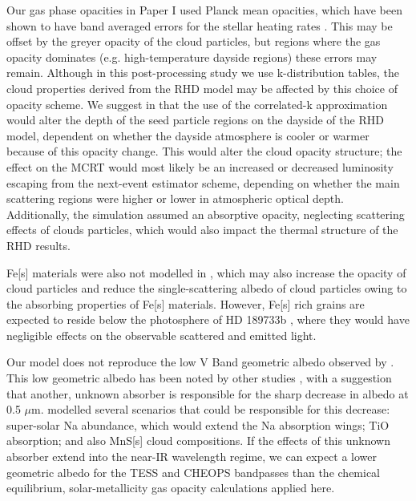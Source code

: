 \documentclass{aa}
\begin{document}
Our gas phase opacities in Paper I used Planck mean opacities, which have been shown to have band averaged errors for the stellar heating rates \citep{Amundsen2014}. 
This may be offset by the greyer opacity of the cloud particles, but regions where the gas opacity dominates (e.g. high-temperature dayside regions) these errors may remain.
Although in this post-processing study we use k-distribution tables, the cloud properties derived from the RHD model may be affected by this choice of opacity scheme.
We suggest in \citet{Lee2016} that the use of the correlated-k approximation would alter the depth of the seed particle regions on the dayside of the RHD model, dependent on whether the dayside atmosphere is cooler or warmer because of this opacity change.
This would alter the cloud opacity structure; the effect on the MCRT would most likely be an increased or decreased luminosity escaping from the next-event estimator scheme, depending on whether the main scattering regions were higher or lower in atmospheric optical depth. 
Additionally, the \citet{Lee2016} simulation assumed an absorptive opacity, neglecting scattering effects of clouds particles, which would also impact the thermal structure of the RHD results.

Fe[s] materials were also not modelled in \citet{Lee2016}, which may also increase the opacity of cloud particles and reduce the single-scattering albedo of cloud particles owing to the absorbing properties of Fe[s] materials.
However, Fe[s] rich grains are expected to reside below the photosphere of HD 189733b \citep{Lee2015b, Helling2016}, where they would have negligible effects on the observable scattered and emitted light.

Our model does not reproduce the low V Band geometric albedo observed by \citet{Evans2013}.
This low geometric albedo has been noted by other studies \citep[e.g.][]{Barstow2014}, with a suggestion that another, unknown absorber is responsible for the sharp decrease in albedo at 0.5 $\mu$m.
\citet{Barstow2014} modelled several scenarios that could be responsible for this decrease: super-solar Na abundance, which would extend the Na absorption wings; TiO absorption; and also MnS[s] cloud compositions.
If the effects of this unknown absorber extend into the near-IR wavelength regime, we can expect a lower geometric albedo for the TESS and CHEOPS bandpasses than the chemical equilibrium, solar-metallicity gas opacity calculations applied here.
\end{document}
